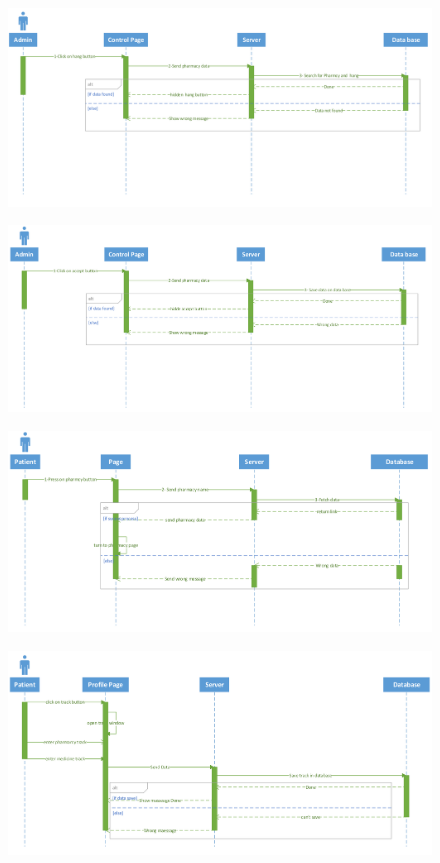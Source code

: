 \documentclass[]{article}
\begin{document}
\begin{figure}[H]
\centering
\includegraphics[scale=0.3]{./sequence/10}
\end{figure}
\begin{figure}[H]
\centering
\includegraphics[scale=0.3]{./sequence/11}
\end{figure}
\begin{figure}[H]
\centering
\includegraphics[scale=0.3]{./sequence/12}
\end{figure}
\begin{figure}[H]
\centering
\includegraphics[scale=0.3]{./sequence/13}
\end{figure}
\end{document}

